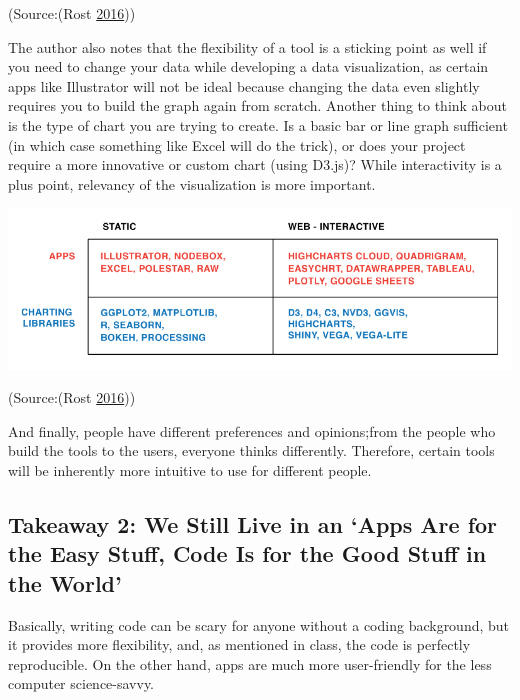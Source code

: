 \documentclass[]{book}
\begin{document}
(Source:(Rost \protect\hyperlink{ref-different_tools}{2016}))

The author also notes that the flexibility of a tool is a sticking point as well if you need to change your data while developing a data visualization, as certain apps like Illustrator will not be ideal because changing the data even slightly requires you to build the graph again from scratch. Another thing to think about is the type of chart you are trying to create. Is a basic bar or line graph sufficient (in which case something like Excel will do the trick), or does your project require a more innovative or custom chart (using D3.js)? While interactivity is a plus point, relevancy of the visualization is more important.

\includegraphics{images/interactivity.png}

(Source:(Rost \protect\hyperlink{ref-different_tools}{2016}))

And finally, people have different preferences and opinions;from the people who build the tools to the users, everyone thinks differently. Therefore, certain tools will be inherently more intuitive to use for different people.

\hypertarget{takeaway-2-we-still-live-in-an-apps-are-for-the-easy-stuff-code-is-for-the-good-stuff-in-the-world}{%
\subsection{Takeaway 2: We Still Live in an `Apps Are for the Easy Stuff, Code Is for the Good Stuff in the World'}\label{takeaway-2-we-still-live-in-an-apps-are-for-the-easy-stuff-code-is-for-the-good-stuff-in-the-world}}

Basically, writing code can be scary for anyone without a coding background, but it provides more flexibility, and, as mentioned in class, the code is perfectly reproducible. On the other hand, apps are much more user-friendly for the less computer science-savvy.
\end{document}
